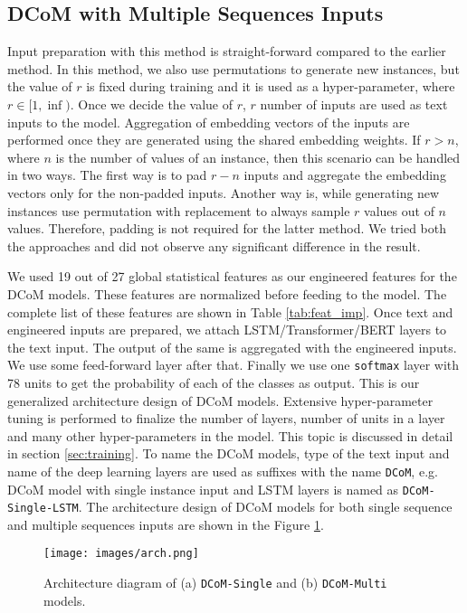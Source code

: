 \documentclass{article}
\begin{document}
\subsection{DCoM with Multiple Sequences Inputs}
Input preparation with this method is straight-forward compared to the earlier method. In this method, we also use permutations to generate new instances, but the value of $r$ is fixed during training and it is used as a hyper-parameter, where $r \in [1, \inf)$. Once we decide the value of $r$, $r$ number of inputs are used as text inputs to the model. Aggregation of embedding vectors of the inputs are performed once they are generated using the shared embedding weights. If $r > n$, where $n$ is the number of values of an instance, then this scenario can be handled in two ways. The first way is to pad $r-n$ inputs and aggregate the embedding vectors only for the non-padded inputs. Another way is, while generating new instances use permutation with replacement to always sample $r$ values out of $n$ values. Therefore, padding is not required for the latter method. We tried both the approaches and did not observe any significant difference in the result.

We used 19 out of 27 global statistical features \cite{Hulsebos} as our engineered features for the DCoM models. These features are normalized before feeding to the model. The complete list of these features are shown in Table \ref{tab:feat_imp}. Once text and engineered inputs are prepared, we attach LSTM/Transformer/BERT layers to the text input. The output of the same is aggregated with the engineered inputs. We use some feed-forward layer after that. Finally we use one \texttt{softmax} layer with 78 units to get the probability of each of the classes as output. This is our generalized architecture design of DCoM models. Extensive hyper-parameter tuning is performed to finalize the number of layers, number of units in a layer and many other hyper-parameters in the model. This topic is discussed in detail in section \ref{sec:training}. To name the DCoM models, type of the text input and name of the deep learning layers are used as suffixes with the name \texttt{DCoM}, e.g. DCoM model with single instance input and LSTM layers is named as \texttt{DCoM-Single-LSTM}. The architecture design of DCoM models for both single sequence and multiple sequences inputs are shown in the Figure \ref{fig:arch}.

\begin{figure}[ht]
	\centering
	\texttt{[image: images/arch.png]}
	\caption{Architecture diagram of (a) \texttt{DCoM-Single} and (b) \texttt{DCoM-Multi} models.}
	\label{fig:arch}
\end{figure}
\end{document}
